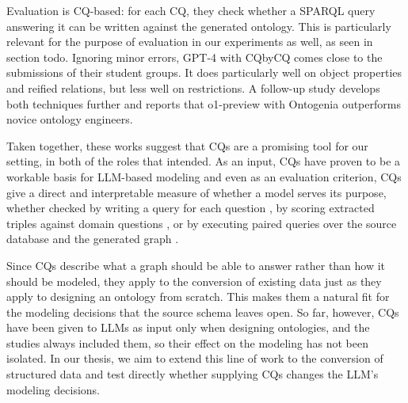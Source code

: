 Evaluation is CQ-based: for each CQ, they check whether a SPARQL query answering it can be written against the generated ontology. This is particularly relevant for the purpose of evaluation in our experiments as well, as seen in section todo. Ignoring minor errors, GPT-4 with CQbyCQ comes close to the submissions of their student groups. It does particularly well on object properties and reified relations, but less well on restrictions. A follow-up study \citep{lippolis2025ontology} develops both techniques further and reports that o1-preview with Ontogenia outperforms novice ontology engineers.


Taken together, these works suggest that CQs are a promising tool for our setting, in both of the roles that \citet{gruninger1995methodology} intended. As an input, CQs have proven to be a workable basis for LLM-based modeling and even as an evaluation criterion, CQs give a direct and interpretable measure of whether a model serves its purpose, whether checked by writing a query for each question \citep{saeedizade2024navigating}, by scoring extracted triples against domain questions \citep{hariri2025towards}, or by executing paired queries over the source database and the generated graph \citep{xiao2025llm4vkg}. 

Since CQs describe what a graph should be able to answer rather than how it should be modeled, they apply to the conversion of existing data just as they apply to designing an ontology from scratch. This makes them a natural fit for the modeling decisions that the source schema leaves open. So far, however, CQs have been given to LLMs as input only when designing ontologies, and the studies always included them, so their effect on the modeling has not been isolated. In our thesis, we aim to extend this line of work to the conversion of structured data and test directly whether supplying CQs changes the LLM's modeling decisions. 

